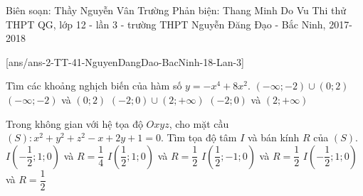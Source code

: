 
\begin{name}
{Biên soạn: Thầy Nguyễn Vân Trường
Phản biện: Thang Minh Do Vu}
{Thi thử THPT QG, lớp 12 - lần 3 - trường THPT
Nguyễn Đăng Đạo - Bắc Ninh, 2017-2018}
\end{name}
\setcounter{ex}{0}
[ans/ans-2-TT-41-NguyenDangDao-BacNinh-18-Lan-3]

\begin{ex}%
Tìm các khoảng nghịch biến của hàm số $y=-x^4+8x^2$.
\choice
{$(-\infty;-2) \cup (0;2)$}
{$(-\infty;-2)$ và $ (0;2)$}
{$(-2;0) \cup (2;+\infty)$}
{\True $(-2;0) $ và $ (2;+\infty)$}
\end{ex}

\begin{ex}%
Trong không gian với hệ tọa độ $Oxyz$,  cho mặt cầu $(S): x^2+y^2+z^2-x+2y+1=0$. Tìm tọa độ   tâm  $I$   và bán kính $R$  của $(S)$.
\choice
{$I\left(-\dfrac{1}{2};1;0\right)$ và  $R = \dfrac{1}{4}$}
{$I\left(\dfrac{1}{2};1;0\right)$  và  $R = \dfrac{1}{2}$}
{\True $I\left(\dfrac{1}{2};-1;0\right)$  và  $R = \dfrac{1}{2}$}
{$I\left(-\dfrac{1}{2};1;0\right)$  và  $R = \dfrac{1}{2}$}
\end{ex}

